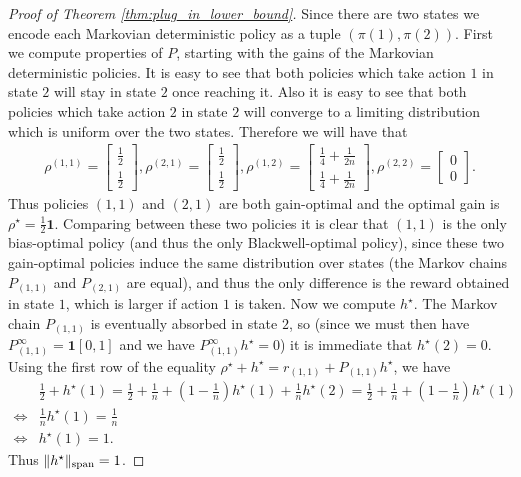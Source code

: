 \documentclass{article}
\theoremstyle{plain}
\theoremstyle{plain}
\theoremstyle{remark}
\theoremstyle{plain}
\theoremstyle{plain}
\newcommand{\one}{\mathbf{1}}
\begin{document}
\begin{proof}[Proof of Theorem \ref{thm:plug_in_lower_bound}]
Since there are two states we encode each Markovian deterministic policy as a tuple $(\pi(1), \pi(2))$. First we compute properties of $P$, starting with the gains of the Markovian deterministic policies. It is easy to see that both policies which take action $1$ in state $2$ will stay in state $2$ once reaching it. Also it is easy to see that both policies which take action $2$ in state $2$ will converge to a limiting distribution which is uniform over the two states. Therefore we will have that
\begin{align*}
    \rho^{(1,1)} = \begin{bmatrix}
        \frac{1}{2} \\ \frac{1}{2}
    \end{bmatrix},
    \rho^{(2,1)} = \begin{bmatrix}
        \frac{1}{2} \\ \frac{1}{2}
    \end{bmatrix},
    \rho^{(1,2)} = \begin{bmatrix}
        \frac{1}{4} + \frac{1}{2n} \\ \frac{1}{4} + \frac{1}{2n}
    \end{bmatrix},
    \rho^{(2,2)} = \begin{bmatrix}
        0 \\ 0
    \end{bmatrix}.
\end{align*}
Thus policies $(1,1)$ and $(2,1)$ are both gain-optimal and the optimal gain is $\rho^\star = \frac{1}{2}\one$. Comparing between these two policies it is clear that $(1,1)$ is the only bias-optimal policy (and thus the only Blackwell-optimal policy), since these two gain-optimal policies induce the same distribution over states (the Markov chains $P_{(1,1)}$ and $P_{(2,1)}$ are equal), and thus the only difference is the reward obtained in state $1$, which is larger if action $1$ is taken. 
Now we compute $h^\star$. The Markov chain $P_{ (1,1)}$ is eventually absorbed in state $2$, so (since we must then have $P^\infty_{(1,1)} = \one [0, 1]$ and we have $P^\infty_{(1,1)} h^\star = 0$) it is immediate that $h^\star(2) = 0$.
Using the first row of the equality $\rho^\star + h^\star = r_{(1,1)} + P_{(1,1)}  h^\star$, we have
\begin{align*}
    & \frac{1}{2} + h^\star(1) = \frac{1}{2}+\frac{1}{n} + \left(1-\frac{1}{n} \right) h^\star(1) + \frac{1}{n} h^\star(2) =  \frac{1}{2}+\frac{1}{n} + \left(1-\frac{1}{n} \right) h^\star(1) \\
    \iff & \frac{1}{n}h^\star(1) = \frac{1}{n} \\
    \iff &h^\star(1) = 1.
\end{align*}
Thus $\Vert h^\star\Vert _{\textnormal{span}} = 1$.


\end{proof}
\end{document}
